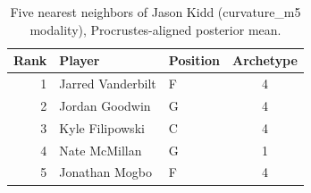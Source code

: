 \begin{table}[htbp]
  \centering\small
  \begin{tabular}{rllc}
    \toprule
    Rank & Player & Position & Archetype \\
    \midrule
    1 & Jarred Vanderbilt & F & 4 \\
    2 & Jordan Goodwin & G & 4 \\
    3 & Kyle Filipowski & C & 4 \\
    4 & Nate McMillan & G & 1 \\
    5 & Jonathan Mogbo & F & 4 \\
    \bottomrule
  \end{tabular}
  \caption{Five nearest neighbors of Jason Kidd (curvature_m5 modality), Procrustes-aligned posterior mean.}
  \label{tab:Jason_Kidd_neighbors_curvature_m5}
\end{table}

